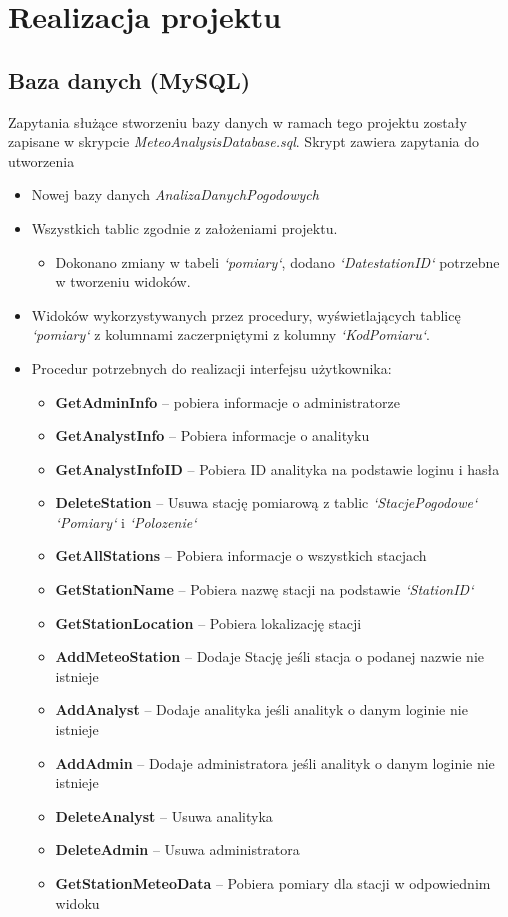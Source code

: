 \documentclass[12pt,a4paper]{article}
\begin{document}
\section{Realizacja projektu}
\subsection{Baza danych (MySQL)}
Zapytania służące stworzeniu bazy danych w ramach tego projektu zostały zapisane w skrypcie \textit{MeteoAnalysisDatabase.sql}. Skrypt zawiera zapytania do utworzenia
\begin{itemize}
\item Nowej bazy danych \textit{AnalizaDanychPogodowych}
\item Wszystkich tablic zgodnie z założeniami projektu.
\begin{itemize}
\item Dokonano zmiany w tabeli \textit{`pomiary`}, dodano \textit{`DatestationID`} potrzebne w tworzeniu widoków.
\end{itemize}
\item Widoków wykorzystywanych przez procedury, wyświetlających tablicę \textit{`pomiary`} z kolumnami zaczerpniętymi z kolumny \textit{`KodPomiaru`}.
\item Procedur potrzebnych do realizacji interfejsu użytkownika:
\begin{itemize}
\item \textbf{GetAdminInfo} -- pobiera informacje o administratorze
\item \textbf{GetAnalystInfo} -- Pobiera informacje o analityku
\item \textbf{GetAnalystInfoID} -- Pobiera ID analityka na podstawie loginu i hasła
\item \textbf{DeleteStation} -- Usuwa stację pomiarową z tablic \textit{`StacjePogodowe`} \textit{`Pomiary`} i \textit{`Polozenie`}
\item \textbf{GetAllStations} -- Pobiera informacje o wszystkich stacjach
\item \textbf{GetStationName} -- Pobiera nazwę stacji na podstawie \textit{`StationID`}
\item \textbf{GetStationLocation} -- Pobiera lokalizację stacji
\item \textbf{AddMeteoStation} -- Dodaje Stację jeśli stacja o podanej nazwie nie istnieje
\item \textbf{AddAnalyst} -- Dodaje analityka jeśli analityk o danym loginie nie istnieje
\item \textbf{AddAdmin} -- Dodaje administratora jeśli analityk o danym loginie nie istnieje
\item \textbf{DeleteAnalyst} -- Usuwa analityka
\item \textbf{DeleteAdmin }-- Usuwa administratora
\item \textbf{GetStationMeteoData} -- Pobiera pomiary dla stacji w odpowiednim widoku
\end{itemize}
\end{itemize}
\end{document}
